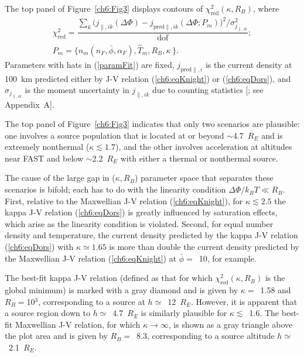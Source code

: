   The top panel of Figure~\ref{ch6:Fig3} displays contours of
  $\chi^2_{\textrm{red}} ( \kappa, R_B )$, where
  \begin{subequations}
    \begin{align} \chi^2_{\mathrm{red}} = \dfrac{\sum_k \Big ( j_{\parallel,i k} (\Delta \Phi) - j_{\textrm{pred}\parallel,i k}(\Delta \Phi; P_m) \Big )^2 \Big / \sigma_{j_{\parallel,i k}}^2}{\mathrm{dof}}; \label{ch6:eqChi2red} \\
      P_m = \Big \{ n_m ( \hat{n}_F, \bar{\phi} , \alpha_F ), \hat{T}_m, R_B,
      \kappa \, \Big \}. \label{paramFit}
    \end{align}
  \end{subequations}
  Parameters with hats in (\ref{paramFit}) are fixed,
  $j_{\textrm{pred}\parallel,i} $ is the current density at 100~km predicted
  either by J-V relation (\ref{ch6:eqKnight}) or (\ref{ch6:eqDors}), and
  $\sigma_{j_{\parallel,i k}}$ is the moment uncertainty in $j_{\parallel,i k}$
  due to counting statistics [\citealp{Gershman2015}; see Appendix~A].

  The top panel of Figure~\ref{ch6:Fig3} indicates that only two scenarios are
  plausible: one involves a source population that is located at or beyond
  $\sim$4.7~$R_E$ and is extremely nonthermal ($\kappa \lesssim 1.7$), and the
  other involves acceleration at altitudes near FAST and below $\sim$2.2~$R_E$
  with either a thermal or nonthermal source.

  The cause of the large gap in ($\kappa, R_B$) parameter space that separates
  these scenarios is bifold; each has to do with the linearity condition
  $\Delta \Phi / k_B T \ll R_B $. First, relative to the Maxwellian J-V relation
  (\ref{ch6:eqKnight}), for $\kappa \lesssim 2.5$ the kappa J-V relation
  (\ref{ch6:eqDors}) is greatly influenced by saturation effects, which arise as
  the linearity condition is violated. Second, for equal number density and
  temperature, the current density predicted by the kappa J-V relation
  (\ref{ch6:eqDors}) with $\kappa \simeq 1.65$ is more than double the current
  density predicted by the Maxwellian J-V relation (\ref{ch6:eqKnight}) at
  $\bar{\phi} =$~10, for example.

  The best-fit kappa J-V relation (defined as that for which
  $\chi^2_{\textrm{red}} ( \kappa, R_B )$ is the global minimum) is marked with
  a gray diamond and is given by $\kappa =$~1.58 and $R_B =$10$^3$,
  corresponding to a source at $h \simeq$~12~$R_E$. However, it is apparent that
  a source region down to $h \simeq$~4.7~$R_E$ is similarly plausible for
  $\kappa \lesssim$~1.6. The best-fit Maxwellian J-V relation, for which
  $\kappa \rightarrow \infty$, is shown as a gray triangle above the plot area
  and is given by $R_B =$~8.3, corresponding to a source altitude
  $h \simeq$~2.1~$R_E$.

